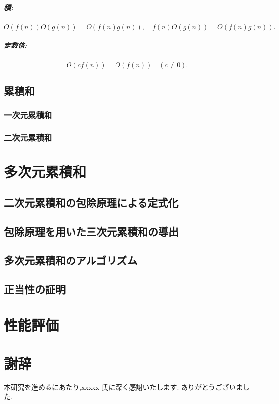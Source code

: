 \documentclass{jsreport}
\theoremstyle{plain} %
\theoremstyle{definition}
\begin{document}
\paragraph{積:}
\[
O(f(n))O(g(n)) = O(f(n)g(n)), \quad f(n)O(g(n)) = O(f(n)g(n)).
\]

\paragraph{定数倍:}
\[
O(cf(n)) = O(f(n)) \quad (c \neq 0).
\]

\section{累積和}
\subsection{一次元累積和}
\subsection{二次元累積和}

\chapter{多次元累積和}
\section{二次元累積和の包除原理による定式化}
\section{包除原理を用いた三次元累積和の導出}
\section{多次元累積和のアルゴリズム}
\section{正当性の証明}

\chapter{性能評価}

\chapter*{謝辞}
本研究を進めるにあたり,xxxxx 氏に深く感謝いたします. ありがとうございました.
\end{document}
